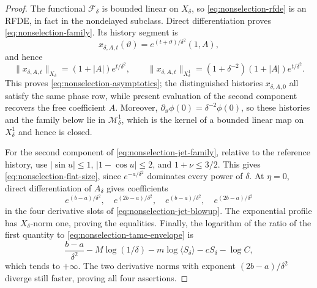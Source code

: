 \begin{proof}
The functional \(\mathcal F_\delta\) is bounded linear on \(X_\delta\),
so \cref{eq:nonselection-rfde} is an RFDE, in fact in the nondelayed
subclass.  Direct differentiation proves \cref{eq:nonselection-family}.
Its history segment is
\begin{equation*}
 x_{\delta,A,t}(\vartheta)=e^{(t+\vartheta)/\delta^2}(1,A),
\end{equation*}
and hence
\begin{equation*}
 \|x_{\delta,A,t}\|_{X_\delta}=(1+|A|)e^{t/\delta^2},
 \qquad
 \|x_{\delta,A,t}\|_{X^1_\delta}
 =(1+\delta^{-2})(1+|A|)e^{t/\delta^2}.
\end{equation*}
This proves \cref{eq:nonselection-asymptotics}; the distinguished histories
\(x_{\delta,A,0}\) all satisfy the same phase row, while present evaluation
of the second component recovers the free coefficient \(A\).  Moreover,
\(\partial_\vartheta\phi(0)=\delta^{-2}\phi(0)\), so these histories and
the family below lie in \(\mathcal M^1_\delta\), which is the kernel of a
bounded linear map on \(X^1_\delta\) and hence is closed.

For the second component of \cref{eq:nonselection-jet-family}, relative to
the reference history, use
\(|\sin u|\le1\), \(|1-\cos u|\le2\), and
\(1+\nu\le3/2\).  This gives \cref{eq:nonselection-flat-size}, since
\(e^{-a/\delta^2}\) dominates every power of \(\delta\).  At \(\eta=0\),
direct differentiation of \(A_\delta\) gives coefficients
\begin{equation*}
 e^{(b-a)/\delta^2},\quad e^{(2b-a)/\delta^2},\quad
 e^{(b-a)/\delta^2},\quad e^{(2b-a)/\delta^2}
\end{equation*}
in the four derivative slots of
\cref{eq:nonselection-jet-blowup}.  The exponential profile has
\(X_\delta\)-norm one, proving the equalities.  Finally, the logarithm of
the ratio of the first quantity to
\cref{eq:nonselection-tame-envelope} is
\begin{equation*}
 \frac{b-a}{\delta^2}-M\log(1/\delta)
 -m\log\langle S_\delta\rangle-cS_\delta-\log C,
\end{equation*}
which tends to \(+\infty\).  The two derivative norms with exponent
\((2b-a)/\delta^2\) diverge still faster, proving all four assertions.
\end{proof}


